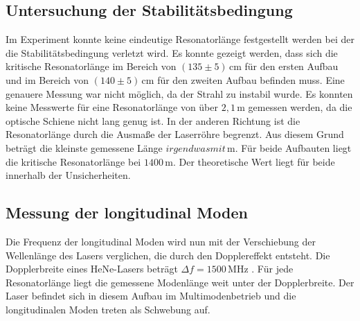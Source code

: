 \subsection{Untersuchung der Stabilitätsbedingung}
\label{sec:Stab_be}
Im Experiment konnte keine eindeutige Resonatorlänge festgestellt werden bei der die Stabilitätsbedingung verletzt wird.
Es konnte gezeigt werden, dass sich die kritische Resonatorlänge im Bereich von $ \left( 135 \pm 5 \right) \, \unit{\centi\meter}$ für den ersten Aufbau und im Bereich von
$ \left( 140 \pm 5 \right) \, \unit{\centi\meter}$ für den zweiten Aufbau befinden muss. Eine genauere Messung war nicht möglich, da der Strahl zu instabil wurde.
Es konnten keine Messwerte für eine Resonatorlänge von über $2,1 \, \unit{\meter}$ gemessen werden, da die optische Schiene nicht lang genug ist.
In der anderen Richtung ist die Resonatorlänge durch die Ausmaße der Laserröhre begrenzt. Aus diesem Grund beträgt die kleinste gemessene Länge $irgendwas mit \, \unit{\meter}$.
Für beide Aufbauten liegt die kritische Resonatorlänge bei $1400 \, \unit{\meter}$. Der theoretische Wert liegt für beide innerhalb der Unsicherheiten. 


\subsection{Messung der longitudinal Moden}
\label{sec:Stab_be}

Die Frequenz der longitudinal Moden wird nun mit der Verschiebung der Wellenlänge des Lasers verglichen, die durch den Dopplereffekt entsteht.
Die Dopplerbreite eines HeNe-Lasers beträgt $ \Delta f = 1500 \, \unit{\mega\hertz}$ \cite{eicheich}. Für jede Resonatorlänge liegt die gemessene Modenlänge weit unter der Dopplerbreite.
Der Laser befindet sich in diesem Aufbau im Multimodenbetrieb und die longitudinalen Moden treten als Schwebung auf.
